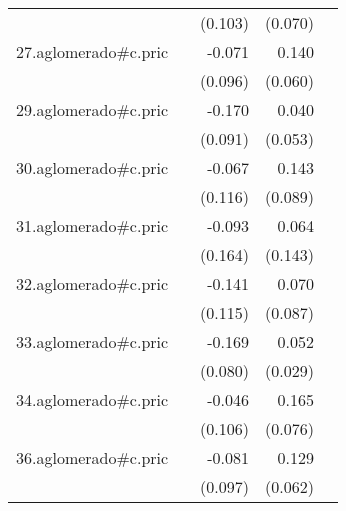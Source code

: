 {\begin{longtable}{l*{4}{D{.}{.}{-1}}}
            &                     &     (0.103)         &     (0.070)         &                     \\
\addlinespace
27.aglomerado#c.pric&                     &      -0.071         &       0.140\sym{*}  &                     \\
            &                     &     (0.096)         &     (0.060)         &                     \\
\addlinespace
29.aglomerado#c.pric&                     &      -0.170         &       0.040         &                     \\
            &                     &     (0.091)         &     (0.053)         &                     \\
\addlinespace
30.aglomerado#c.pric&                     &      -0.067         &       0.143         &                     \\
            &                     &     (0.116)         &     (0.089)         &                     \\
\addlinespace
31.aglomerado#c.pric&                     &      -0.093         &       0.064         &                     \\
            &                     &     (0.164)         &     (0.143)         &                     \\
\addlinespace
32.aglomerado#c.pric&                     &      -0.141         &       0.070         &                     \\
            &                     &     (0.115)         &     (0.087)         &                     \\
\addlinespace
33.aglomerado#c.pric&                     &      -0.169\sym{*}  &       0.052         &                     \\
            &                     &     (0.080)         &     (0.029)         &                     \\
\addlinespace
34.aglomerado#c.pric&                     &      -0.046         &       0.165\sym{*}  &                     \\
            &                     &     (0.106)         &     (0.076)         &                     \\
\addlinespace
36.aglomerado#c.pric&                     &      -0.081         &       0.129\sym{*}  &                     \\
            &                     &     (0.097)         &     (0.062)         &                     \\

\end{longtable}}
